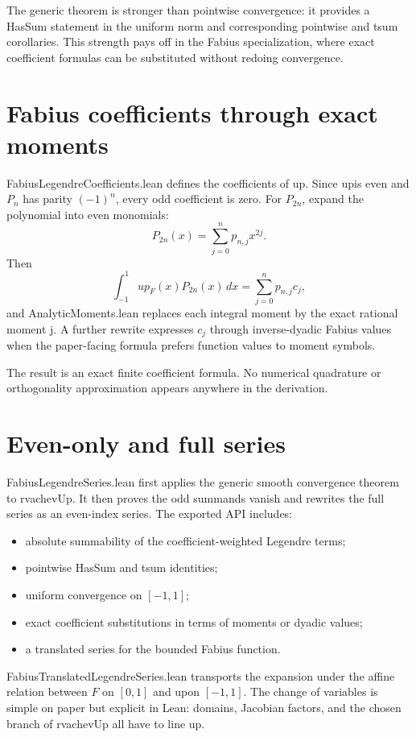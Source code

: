 \documentclass[11pt,a4paper,openany]{book}
\def\module#1{#1.lean}
\def\decl#1{#1}
\def\code#1{#1}
\def\upfun{up}
\newcommand{\upfun}{\ensuremath{\operatorname{up}}}
\newcommand{\module}[1]{\nolinkurl{#1.lean}}
\newcommand{\decl}[1]{\texttt{\detokenize{#1}}}
\newcommand{\code}[1]{\texttt{\detokenize{#1}}}
\begin{document}
The generic theorem is stronger than pointwise convergence: it provides a
\code{HasSum} statement in the uniform norm and corresponding pointwise and
\code{tsum} corollaries.  This strength pays off in the Fabius specialization,
where exact coefficient formulas can be substituted without redoing
convergence.

\section{Fabius coefficients through exact moments}
\module{FabiusLegendreCoefficients} defines the coefficients of \upfun.  Since
\upfun is even and $P_n$ has parity $(-1)^n$, every odd coefficient is zero.
For $P_{2n}$, expand the polynomial into even monomials:
\[
 P_{2n}(x)=\sum_{j=0}^{n}p_{n,j}x^{2j}.
\]
Then
\[
 \int_{-1}^{1}\upfun_F(x)P_{2n}(x)\,dx
   =\sum_{j=0}^{n}p_{n,j}c_j,
\]
and \module{AnalyticMoments} replaces each integral moment by the exact rational
\decl{moment j}.  A further rewrite expresses $c_j$ through inverse-dyadic
Fabius values when the paper-facing formula prefers function values to moment
symbols.

The result is an exact finite coefficient formula.  No numerical quadrature or
orthogonality approximation appears anywhere in the derivation.

\section{Even-only and full series}
\module{FabiusLegendreSeries} first applies the generic smooth convergence
theorem to \decl{rvachevUp}.  It then proves the odd summands vanish and rewrites
the full series as an even-index series.  The exported API includes:
\begin{itemize}
  \item absolute summability of the coefficient-weighted Legendre terms;
  \item pointwise \code{HasSum} and \code{tsum} identities;
  \item uniform convergence on $[-1,1]$;
  \item exact coefficient substitutions in terms of moments or dyadic values;
  \item a translated series for the bounded Fabius function.
\end{itemize}

\module{FabiusTranslatedLegendreSeries} transports the expansion under the
affine relation between $F$ on $[0,1]$ and \upfun on $[-1,1]$.  The change of
variables is simple on paper but explicit in Lean: domains, Jacobian factors,
and the chosen branch of \decl{rvachevUp} all have to line up.
\end{document}

